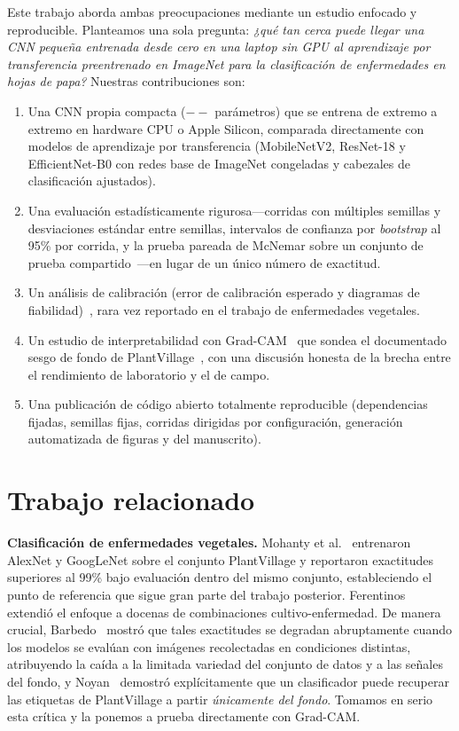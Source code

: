 \documentclass[10pt]{article}
\providecommand{\paramsCustom}{--}\providecommand{\trainparamsCustom}{--}
\begin{document}
Este trabajo aborda ambas preocupaciones mediante un estudio enfocado y reproducible.
Planteamos una sola pregunta: \emph{¿qué tan cerca puede llegar una CNN pequeña
entrenada desde cero en una laptop sin GPU al aprendizaje por transferencia
preentrenado en ImageNet para la clasificación de enfermedades en hojas de papa?}
Nuestras contribuciones son:
\begin{enumerate}
  \item Una CNN propia compacta ($\paramsCustom$ parámetros) que se entrena de
  extremo a extremo en hardware CPU o Apple Silicon, comparada directamente con
  modelos de aprendizaje por transferencia (MobileNetV2, ResNet-18 y EfficientNet-B0
  con redes base de ImageNet congeladas y cabezales de clasificación ajustados).
  \item Una evaluación estadísticamente rigurosa---corridas con múltiples semillas y
  desviaciones estándar entre semillas, intervalos de confianza por \emph{bootstrap}
  al 95\% por corrida, y la prueba pareada de McNemar sobre un conjunto de prueba
  compartido~\cite{dietterich1998mcnemar}---en lugar de un único número de exactitud.
  \item Un análisis de calibración (error de calibración esperado y diagramas de
  fiabilidad)~\cite{guo2017calibration}, rara vez reportado en el trabajo de
  enfermedades vegetales.
  \item Un estudio de interpretabilidad con Grad-CAM~\cite{selvaraju2017gradcam} que
  sondea el documentado sesgo de fondo de PlantVillage~\cite{noyan2022uncovering}, con
  una discusión honesta de la brecha entre el rendimiento de laboratorio y el de campo.
  \item Una publicación de código abierto totalmente reproducible (dependencias
  fijadas, semillas fijas, corridas dirigidas por configuración, generación
  automatizada de figuras y del manuscrito).
\end{enumerate}

\section{Trabajo relacionado}
\textbf{Clasificación de enfermedades vegetales.} Mohanty et al.~\cite{mohanty2016using}
entrenaron AlexNet y GoogLeNet sobre el conjunto PlantVillage y reportaron exactitudes
superiores al 99\% bajo evaluación dentro del mismo conjunto, estableciendo el punto de
referencia que sigue gran parte del trabajo posterior.
Ferentinos~\cite{ferentinos2018deep} extendió el enfoque a docenas de combinaciones
cultivo-enfermedad. De manera crucial, Barbedo~\cite{barbedo2018impact} mostró que
tales exactitudes se degradan abruptamente cuando los modelos se evalúan con imágenes
recolectadas en condiciones distintas, atribuyendo la caída a la limitada variedad del
conjunto de datos y a las señales del fondo, y Noyan~\cite{noyan2022uncovering}
demostró explícitamente que un clasificador puede recuperar las etiquetas de
PlantVillage a partir \emph{únicamente del fondo}. Tomamos en serio esta crítica y la
ponemos a prueba directamente con Grad-CAM.
\end{document}
